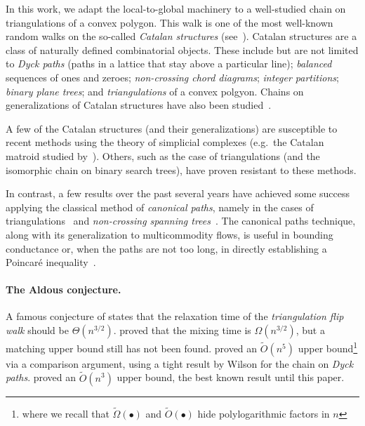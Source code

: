 \documentclass[a4paper, 12p]{article}
\numberwithin{equation}{section}
\begin{document}
In this work, we adapt the local-to-global machinery to a well-studied chain on triangulations of a convex polygon. This walk is one of the most well-known random walks on the so-called \emph{Catalan structures} (see~\cite{aldousclad, aldousconj, cohenthesis, ardilamatroid, wilsonlozenge, mrs, mct, eppstein2022improved}). Catalan structures are a class of naturally defined combinatorial objects. These include but are not limited to \emph{Dyck paths} (paths in a lattice that stay above a particular line); \emph{balanced} sequences of ones and zeroes; \emph{non-crossing chord diagrams}; \emph{integer partitions}; \emph{binary plane trees}; and \emph{triangulations} of a convex polgyon. Chains on generalizations of Catalan structures have also been studied~\cite{eppstein2021rapid, caraceni2020, ncstmixing}.


A few of the Catalan structures (and their generalizations) are susceptible to recent methods using the theory of simplicial complexes (e.g.~the Catalan matroid studied by~\cite{ardilamatroid}). Others, such as the case of triangulations (and the isomorphic chain on binary search trees), have proven resistant to these methods.

In contrast, a few results over the past several years have achieved some success applying the classical method of \emph{canonical paths}, namely in the cases of triangulations~\cite{eppstein2022improved} and \emph{non-crossing spanning trees}~\cite{ncstmixing}.
The canonical paths technique, along with its generalization to multicommodity flows, is useful in bounding conductance or, when the paths are not too long, in directly establishing a Poincar\'e inequality~\cite{diacstroock,sinclairimproved}.

\paragraph{The Aldous conjecture.} A famous conjecture of \cite{aldous1994triangulating} states that the relaxation time of the \emph{triangulation flip walk} should be $\Theta(n^{3/2})$. \cite{mrs} proved that the mixing time is $\Omega(n^{3/2})$, but a matching upper bound still has not been found. \cite{mct} proved an $\widetilde O(n^5)$ upper bound\footnote{where we recall that $\widetilde\Omega(\bullet)$ and $\widetilde O(\bullet)$ hide polylogarithmic factors in $n$} via a comparison argument, using a tight result by Wilson \cite{wilsonlozenge} for the chain on \emph{Dyck paths}. \cite{eppstein2022improved} proved an $\widetilde O(n^3)$ upper bound, the best known result until this paper.
\end{document}

